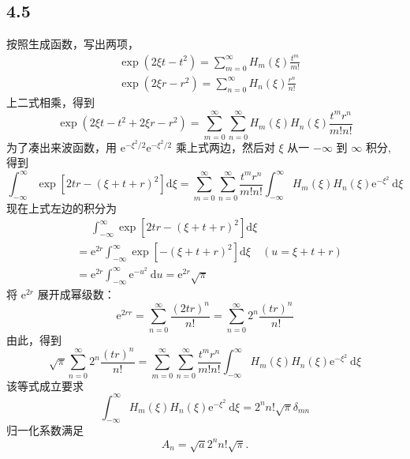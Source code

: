 \subsection{4.5}
按照生成函数，写出两项，
$$
\begin{aligned}
&\exp \left(2 \xi t-t^2\right)=\sum_{m=0}^{\infty} H_m(\xi) \frac{t^m}{m !} \\
&\exp \left(2 \xi r-r^2\right)=\sum_{n=0}^{\infty} H_n(\xi) \frac{r^n}{n !}
\end{aligned}
$$
上二式相乘，得到
$$
\exp \left(2 \xi t-t^2+2 \xi r-r^2\right)=\sum_{m=0}^{\infty} \sum_{n=0}^{\infty} H_m(\xi) H_n(\xi) \frac{t^m r^n}{m ! n !}
$$
为了凑出来波函数，用 $\mathrm{e}^{-\xi^2/2}\mathrm{e}^{-\xi^2/2}$ 乘上式两边，然后对 $\xi$ 从一 $-\infty$ 到 $\infty$ 积分, 得到
$$
\int_{-\infty}^{\infty} \exp \left[2 t r-(\xi+t+r)^2\right] \mathrm{d} \xi=\sum_{m=0}^{\infty} \sum_{n=0}^{\infty} \frac{t^m r^n}{m ! n !} \int_{-\infty}^{\infty} H_m(\xi) H_n(\xi) \mathrm{e}^{-\xi^2} \mathrm{~d} \xi
$$
现在上式左边的积分为
$$
\begin{aligned}
&\phantom{{}={}}\int_{-\infty}^{\infty} \exp \left[2 t r-(\xi+t+r)^2\right] \mathrm{d} \xi \\
&=\mathrm{e}^{2 r} \int_{-\infty}^{\infty} \exp \left[-(\xi+t+r)^2\right] \mathrm{d} \xi \quad(u=\xi+t+r) \\
&=\mathrm{e}^{2 r} \int_{-\infty}^{\infty} \mathrm{e}^{-u^2} \mathrm{~d} u=\mathrm{e}^{2 r} \sqrt{\pi}
\end{aligned}
$$
将 $\mathrm{e}^{2 r}$ 展开成幂级数：
$$
\mathrm{e}^{2 r r}=\sum_{n=0}^{\infty} \frac{(2 t r)^n}{n !}=\sum_{n=0}^{\infty} 2^n \frac{(t r)^n}{n !}
$$
由此，得到
$$
\sqrt{\pi} \sum_{n=0}^{\infty} 2^n \frac{(t r)^n}{n !}=\sum_{m=0}^{\infty} \sum_{n=0}^{\infty} \frac{t^m r^n}{m ! n !} \int_{-\infty}^{\infty} H_m(\xi) H_n(\xi) \mathrm{e}^{-\xi^2} \mathrm{~d} \xi
$$
该等式成立要求
$$
\int_{-\infty}^{\infty} H_m(\xi) H_n(\xi) \mathrm{e}^{-\xi^2} \mathrm{~d} \xi=2^n n ! \sqrt{\pi} \delta_{m n}
$$
归一化系数满足
$$
A_n = \sqrt{a}2^n n ! \sqrt{\pi}. 
$$

